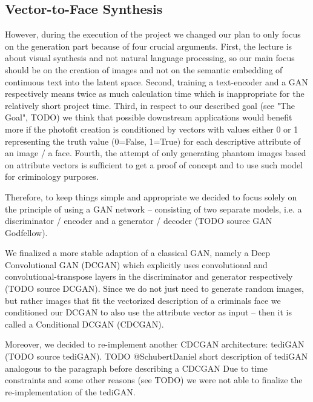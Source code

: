 \documentclass[12pt, a4paper]{article}
\begin{document}
\subsection{Vector-to-Face Synthesis}
However, during the execution of the project we changed our plan to only focus on the generation part because of four
crucial arguments. First, the lecture is about visual synthesis and not natural language processing, so our main focus
should be on the creation of images and not on the semantic embedding of continuous text into the latent space.
Second, training a text-encoder and a GAN respectively means twice as much calculation time which is inappropriate for
the relatively short project time. Third, in respect to our described goal (see "The Goal", TODO) we think that possible
downstream applications would benefit more if the photofit creation is conditioned by vectors with values either 0 or 1
representing the truth value (0=False, 1=True) for each descriptive attribute of an image / a face. Fourth, the attempt
of only generating phantom images based on attribute vectors is sufficient to get a proof of concept and to use such 
model for criminology purposes.

Therefore, to keep things simple and appropriate we decided to focus solely on the principle of using a GAN network --
consisting of two separate models, i.e. a discriminator / encoder and a generator / decoder (TODO source GAN Godfellow).

We finalized a more stable adaption of a classical GAN, namely a Deep Convolutional GAN (DCGAN) which explicitly  uses
convolutional and convolutional-transpose layers in the discriminator and generator respectively (TODO source DCGAN).
Since we do not just need to generate random images, but rather images that fit the vectorized description of
a criminals face we conditioned our DCGAN to also use the attribute vector as input -- then it is called a Conditional
DCGAN (CDCGAN).

Moreover, we decided to re-implement another CDCGAN architecture: tediGAN (TODO source tediGAN).
TODO @SchubertDaniel short description of tediGAN analogous to the paragraph before describing a CDCGAN
Due to time constraints and some other reasons (see TODO) we were not able to finalize the re-implementation of the
tediGAN.
\end{document}
